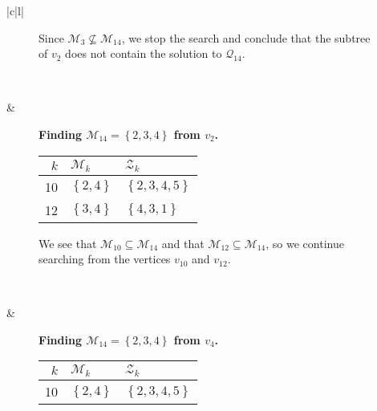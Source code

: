 \begin{figure*}[ht!]
\begin{tabular}[t]{|c|l|}
\begin{subfigure}[b]{0.64\textwidth}
        Since $\mathcal{M}_3 \not \subseteq \mathcal{M}_{14}$, we stop the
        search and conclude that the subtree of $v_2$ does not contain
        the solution to $\mathcal{Q}_{14}$.
    \end{subfigure}
    \\ \hline
    \begin{subfigure}[b]{0.35\textwidth}
        \centering
        
    \end{subfigure}
    & 
    \begin{subfigure}[b]{0.64\textwidth}
        \textbf{Finding $\mathcal{M}_{14} = \left\{{2,3,4}\right\}$ from $v_2$.} \\
        \begin{tabular}{rll}
            $k$ & $\mathcal{M}_k$            & $\mathcal{Z}_k$ \\ \hline
            10  & $\left\{{2,4}\right\}$   & $\left\{{2,3,4,5}\right\}$ \\ 
            12  & $\left\{{3,4}\right\}$   & $\left\{{4,3,1}\right\}$
        \end{tabular}

        We see that $\mathcal{M}_{10} \subseteq \mathcal{M}_{14}$ and that
        $\mathcal{M}_{12} \subseteq \mathcal{M}_{14}$, so we continue
        searching from the vertices $v_{10}$ and $v_{12}$. 
    \end{subfigure}
    \\ \hline
    \begin{subfigure}[b]{0.35\textwidth}
        \centering
        
    \end{subfigure}
    & 
    \begin{subfigure}[b]{0.64\textwidth}
        \textbf{Finding $\mathcal{M}_{14} = \left\{{2,3,4}\right\}$ from $v_4$.} \\
        \begin{tabular}{rll}
            $k$ & $\mathcal{M}_k$            & $\mathcal{Z}_k$ \\ \hline
            10  & $\left\{{2,4}\right\}$   & $\left\{{2,3,4,5}\right\}$ \\ 
        \end{tabular}


\end{subfigure}
\end{tabular}
\end{figure*}
